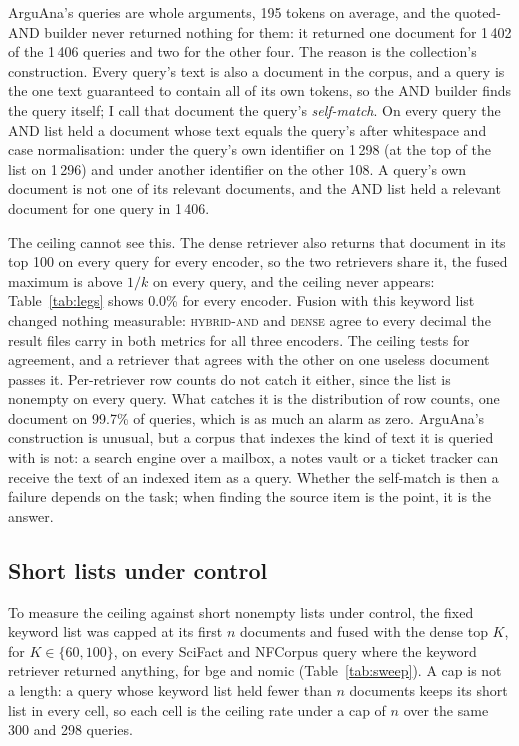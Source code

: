 \documentclass[11pt]{article}
\begin{document}
ArguAna's queries are whole arguments, 195 tokens on average, and the quoted-AND builder never returned nothing for them: it returned one document for 1\,402 of the 1\,406 queries and two for the other four. The reason is the collection's construction. Every query's text is also a document in the corpus, and a query is the one text guaranteed to contain all of its own tokens, so the AND builder finds the query itself; I call that document the query's \emph{self-match}. On every query the AND list held a document whose text equals the query's after whitespace and case normalisation: under the query's own identifier on 1\,298 (at the top of the list on 1\,296) and under another identifier on the other 108. A query's own document is not one of its relevant documents, and the AND list held a relevant document for one query in 1\,406.

The ceiling cannot see this. The dense retriever also returns that document in its top 100 on every query for every encoder, so the two retrievers share it, the fused maximum is above $1/k$ on every query, and the ceiling never appears: Table~\ref{tab:legs} shows 0.0\% for every encoder. Fusion with this keyword list changed nothing measurable: \textsc{hybrid-and} and \textsc{dense} agree to every decimal the result files carry in both metrics for all three encoders. The ceiling tests for agreement, and a retriever that agrees with the other on one useless document passes it. Per-retriever row counts do not catch it either, since the list is nonempty on every query. What catches it is the distribution of row counts, one document on 99.7\% of queries, which is as much an alarm as zero. ArguAna's construction is unusual, but a corpus that indexes the kind of text it is queried with is not: a search engine over a mailbox, a notes vault or a ticket tracker can receive the text of an indexed item as a query. Whether the self-match is then a failure depends on the task; when finding the source item is the point, it is the answer.

\subsection{Short lists under control}
\label{sec:sweep}

To measure the ceiling against short nonempty lists under control, the fixed keyword list was capped at its first $n$ documents and fused with the dense top $K$, for $K \in \{60, 100\}$, on every SciFact and NFCorpus query where the keyword retriever returned anything, for bge and nomic (Table~\ref{tab:sweep}). A cap is not a length: a query whose keyword list held fewer than $n$ documents keeps its short list in every cell, so each cell is the ceiling rate under a cap of $n$ over the same 300 and 298 queries.
\end{document}
